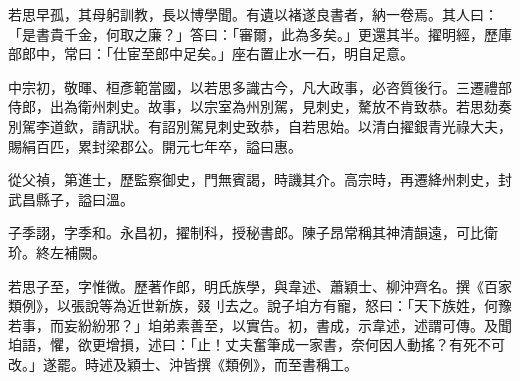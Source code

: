 \begin{pinyinscope}
 若思早孤，其母躬訓教，長以博學聞。有遺以褚遂良書者，納一卷焉。其人曰：「是書貴千金，何取之廉？」答曰：「審爾，此為多矣。」更還其半。擢明經，歷庫部郎中，常曰：「仕宦至郎中足矣。」座右置止水一石，明自足意。



 中宗初，敬暉、桓彥範當國，以若思多識古今，凡大政事，必咨質後行。三遷禮部侍郎，出為衛州刺史。故事，以宗室為州別駕，見刺史，驁放不肯致恭。若思劾奏別駕李道欽，請訊狀。有詔別駕見刺史致恭，自若思始。以清白擢銀青光祿大夫，賜絹百匹，累封梁郡公。開元七年卒，謚曰惠。



 從父禎，第進士，歷監察御史，門無賓謁，時譏其介。高宗時，再遷絳州刺史，封武昌縣子，謚曰溫。



 子季詡，字季和。永昌初，擢制科，授秘書郎。陳子昂常稱其神清韻遠，可比衛玠。終左補闕。



 若思子至，字惟微。歷著作郎，明氏族學，與韋述、蕭穎士、柳沖齊名。撰《百家類例》，以張說等為近世新族，叕刂去之。說子垍方有寵，怒曰：「天下族姓，何豫若事，而妄紛紛邪？」垍弟素善至，以實告。初，書成，示韋述，述謂可傳。及聞垍語，懼，欲更增損，述曰：「止！丈夫奮筆成一家書，奈何因人動搖？有死不可改。」遂罷。時述及穎士、沖皆撰《類例》，而至書稱工。



\end{pinyinscope}
